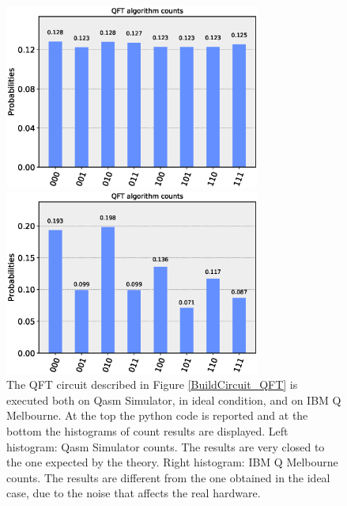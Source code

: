 \begin{figure}[h!]
\begin{lstlisting}[language=Python]
\end{lstlisting}
\centering
\begin{minipage}[c]{0.5\linewidth}
\hspace{1cm}
\includegraphics[width=0.75\textwidth]{./chapter2/image/QFT_qasm_simulator.eps} 
\end{minipage}
\hspace{-1cm}
\begin{minipage}[]{0.5\linewidth}
\centering 
\includegraphics[width=0.75\textwidth]{./chapter2/image/QFT_ibmq_16_melbourne.eps} 
\end{minipage}
\caption{\label{QFT_qasm_melbourne} The QFT circuit described in Figure \ref{BuildCircuit_QFT} is executed both on Qasm Simulator, in ideal condition, and on IBM Q Melbourne. At the top the python code is reported and at the bottom the histograms of count results are displayed. 
Left histogram: Qasm Simulator counts. The results are very closed to the one expected by the theory.
Right histogram: IBM Q Melbourne counts. The results are different from the one obtained in the ideal case, due to the noise that affects the real hardware.}

\end{figure}




